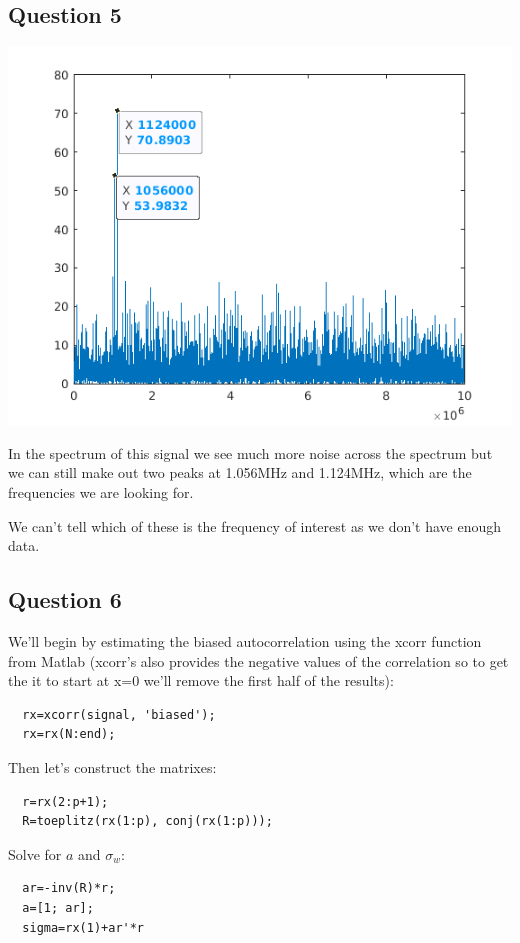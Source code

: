 \documentclass[conference,9pt]{IEEEtran}
\begin{document}
\subsection{Question 5}
\includegraphics[scale=0.6]{q5}

In the spectrum of this signal we see much more noise across the spectrum but we can still make out two peaks at 1.056MHz and 1.124MHz, which are the frequencies we are looking for.

We can't tell which of these is the frequency of interest as we don't have enough data.

\subsection{Question 6}
We'll begin by estimating the biased autocorrelation using the xcorr function from Matlab (xcorr's also provides the negative values of the correlation so to get the it to start at x=0 we'll remove the first half of the results):
\begin{verbatim}
  rx=xcorr(signal, 'biased');
  rx=rx(N:end);
\end{verbatim}

Then let's construct the matrixes:
\begin{verbatim}
  r=rx(2:p+1);
  R=toeplitz(rx(1:p), conj(rx(1:p)));
\end{verbatim}

Solve for $a$ and $\sigma_w$:
\begin{verbatim}
  ar=-inv(R)*r;
  a=[1; ar];
  sigma=rx(1)+ar'*r
\end{verbatim}
\end{document}
